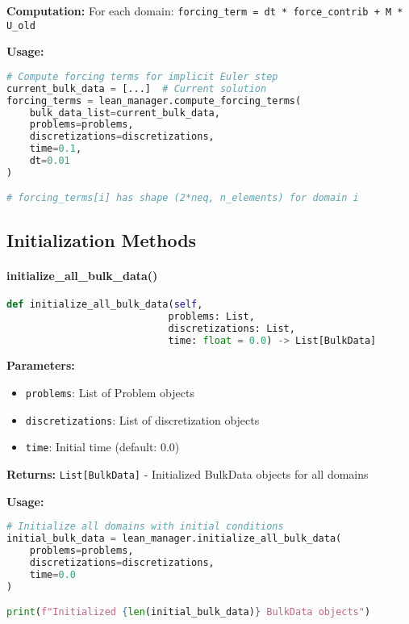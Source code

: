 \textbf{Computation:} For each domain: \texttt{forcing\_term = dt * force\_contrib + M * U\_old}

\textbf{Usage:}
\begin{lstlisting}[language=Python, caption=Forcing Terms Usage]
# Compute forcing terms for implicit Euler step
current_bulk_data = [...]  # Current solution
forcing_terms = lean_manager.compute_forcing_terms(
    bulk_data_list=current_bulk_data,
    problems=problems,
    discretizations=discretizations,
    time=0.1,
    dt=0.01
)

# forcing_terms[i] has shape (2*neq, n_elements) for domain i
\end{lstlisting}

\subsection{Initialization Methods}
\label{subsec:initialization_methods}

\paragraph{initialize\_all\_bulk\_data()}\leavevmode
\begin{lstlisting}[language=Python, caption=Initialize All BulkData Method]
def initialize_all_bulk_data(self, 
                            problems: List,
                            discretizations: List,
                            time: float = 0.0) -> List[BulkData]
\end{lstlisting}

\textbf{Parameters:}
\begin{itemize}
    \item \texttt{problems}: List of Problem objects
    \item \texttt{discretizations}: List of discretization objects
    \item \texttt{time}: Initial time (default: 0.0)
\end{itemize}

\textbf{Returns:} \texttt{List[BulkData]} - Initialized BulkData objects for all domains

\textbf{Usage:}
\begin{lstlisting}[language=Python, caption=Initialize All Usage]
# Initialize all domains with initial conditions
initial_bulk_data = lean_manager.initialize_all_bulk_data(
    problems=problems,
    discretizations=discretizations,
    time=0.0
)

print(f"Initialized {len(initial_bulk_data)} BulkData objects")
\end{lstlisting}

